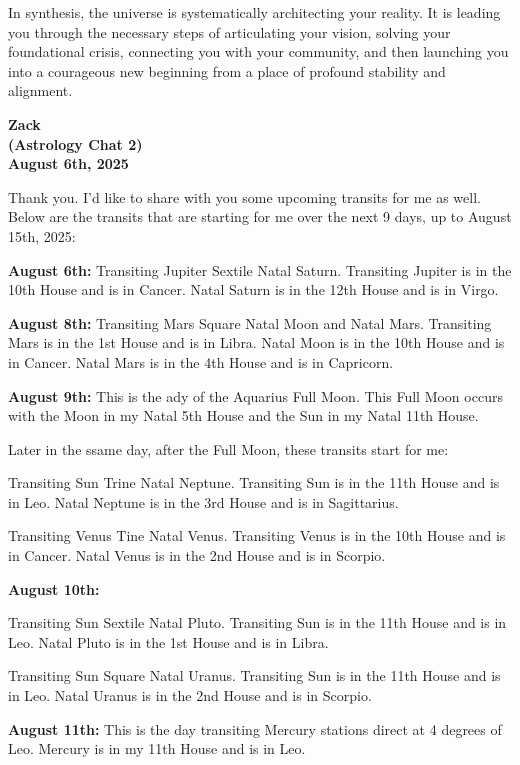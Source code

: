\documentclass{article}
\begin{document}
In synthesis, the universe is systematically architecting your reality. It is leading you through the necessary steps of articulating your vision, solving your foundational crisis, connecting you with your community, and then launching you into a courageous new beginning from a place of profound stability and alignment.


\begin{center}
\textbf{Zack} \\
\textbf{(Astrology Chat 2)} \\
\textbf{August 6th, 2025} 
\end{center}

Thank you. I'd like to share with you some upcoming transits for me as well. Below are the transits that are starting for me over the next 9 days, up to August 15th, 2025:

\textbf{August 6th:} Transiting Jupiter Sextile Natal Saturn. Transiting Jupiter is in the 10th House and is in Cancer. Natal Saturn is in the 12th House and is in Virgo.

\textbf{August 8th:} Transiting Mars Square Natal Moon and Natal Mars. Transiting Mars is in the 1st House and is in Libra. Natal Moon is in the 10th House and is in Cancer. Natal Mars is in the 4th House and is in Capricorn.

\textbf{August 9th:} This is the ady of the Aquarius Full Moon. This Full Moon occurs with the Moon in my Natal 5th House and the Sun in my Natal 11th House.

Later in the ssame day, after the Full Moon, these transits start for me:

Transiting Sun Trine Natal Neptune. Transiting Sun is in the 11th House and is in Leo. Natal Neptune is in the 3rd House and is in Sagittarius.

Transiting Venus Tine Natal Venus. Transiting Venus is in the 10th House and is in Cancer. Natal Venus is in the 2nd House and is in Scorpio.

\textbf{August 10th:}

Transiting Sun Sextile Natal Pluto. Transiting Sun is in the 11th House and is in Leo. Natal Pluto is in the 1st House and is in Libra.

Transiting Sun Square Natal Uranus. Transiting Sun is in the 11th House and is in Leo. Natal Uranus is in the 2nd House and is in Scorpio.

\textbf{August 11th:} This is the day transiting Mercury stations direct at 4 degrees of Leo. Mercury is in my 11th House and is in Leo.
\end{document}
